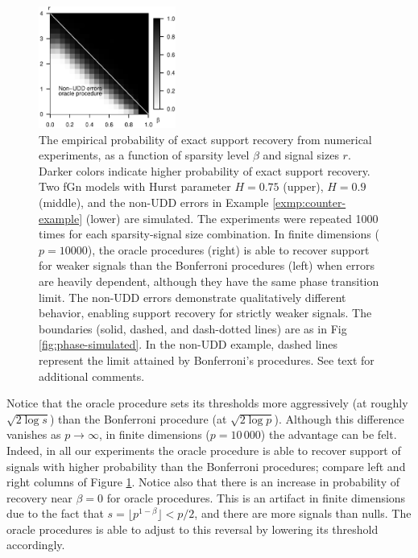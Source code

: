 \begin{figure}
    \includegraphics[width=0.4\textwidth]{./figures/simulated_boundaries/simulated_phase_diagram_block_structure_p10000_oracle6.eps}
    \caption{The empirical probability of exact support recovery from numerical experiments, as a function of sparsity level $\beta$ and signal sizes $r$. Darker colors indicate higher probability of exact support recovery. 
    Two fGn models with Hurst parameter $H = 0.75$ (upper), 
    $H = 0.9$ (middle), and the non-UDD errors in Example \ref{exmp:counter-example} (lower) are simulated.
    The experiments were repeated 1000 times for each sparsity-signal size combination.
    In finite dimensions ($p=10000$), the oracle procedures (right) is able to recover support for weaker signals than the Bonferroni procedures (left) when errors are heavily dependent, although they have the same phase transition limit.
    The non-UDD errors demonstrate qualitatively different behavior, enabling support recovery for strictly weaker signals.
    The boundaries (solid, dashed, and dash-dotted lines) are as in Fig \ref{fig:phase-simulated}.
    In the non-UDD example, dashed lines represent the limit attained by Bonferroni's procedures.
    See text for additional comments.}
    \label{fig:phase-simulated-very-dependent}
\end{figure}


Notice that the oracle procedure sets its thresholds more aggressively (at roughly $\sqrt{2\log s}$) than the Bonferroni procedure (at $\sqrt{2\log p}$).
Although this difference vanishes as $p\to\infty$, in finite dimensions ($p=10\,000$) the advantage can be felt. 
Indeed, in all our experiments the oracle procedure is able to recover support of signals with higher probability than the Bonferroni procedures; compare left and right columns of Figure  \ref{fig:phase-simulated-very-dependent}.
Notice also that there is an increase in probability of recovery near $\beta=0$ for oracle procedures.
This is an artifact in finite dimensions due to the fact that $s = \lfloor p^{1-\beta}\rfloor < p/2$, and there are more signals than nulls. The oracle procedures is able to adjust to this reversal by lowering its threshold accordingly.

